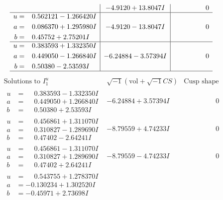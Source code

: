 \documentclass[1p]{elsarticle_modified}
\theoremstyle{definition}
\newcommand{\I}{\sqrt{-1}}
\begin{document}
$$\begin{array}{c|c|c}
 & -4.9120 + 13.8047 I & \phantom{-0.000000 } 0 \\ \hline\begin{aligned}
u &= \phantom{-}0.562121 - 1.266420 I \\
a &= \phantom{-}0.086370 + 1.295980 I \\
b &= \phantom{-}0.45752 + 2.75201 I\end{aligned}
 & -4.9120 - 13.8047 I & \phantom{-0.000000 } 0 \\ \hline\begin{aligned}
u &= \phantom{-}0.383593 + 1.332350 I \\
a &= \phantom{-}0.449050 - 1.266840 I \\
b &= \phantom{-}0.50380 - 2.53593 I\end{aligned}
 & -6.24884 - 3.57394 I & \phantom{-0.000000 } 0\\
 \hline 
 \end{array}$$\newpage$$\begin{array}{c|c|c}  
\text{Solutions to }I^u_{1}& \I (\text{vol} + \sqrt{-1}CS) & \text{Cusp shape}\\
 \hline 
\begin{aligned}
u &= \phantom{-}0.383593 - 1.332350 I \\
a &= \phantom{-}0.449050 + 1.266840 I \\
b &= \phantom{-}0.50380 + 2.53593 I\end{aligned}
 & -6.24884 + 3.57394 I & \phantom{-0.000000 } 0 \\ \hline\begin{aligned}
u &= \phantom{-}0.456861 + 1.311070 I \\
a &= \phantom{-}0.310827 - 1.289690 I \\
b &= \phantom{-}0.47402 - 2.64241 I\end{aligned}
 & -8.79559 + 4.74233 I & \phantom{-0.000000 } 0 \\ \hline\begin{aligned}
u &= \phantom{-}0.456861 - 1.311070 I \\
a &= \phantom{-}0.310827 + 1.289690 I \\
b &= \phantom{-}0.47402 + 2.64241 I\end{aligned}
 & -8.79559 - 4.74233 I & \phantom{-0.000000 } 0 \\ \hline\begin{aligned}
u &= \phantom{-}0.543755 + 1.278370 I \\
a &= -0.130234 + 1.302520 I \\
b &= -0.45971 + 2.73698 I\end{aligned}

\end{array}$$
\end{document}
